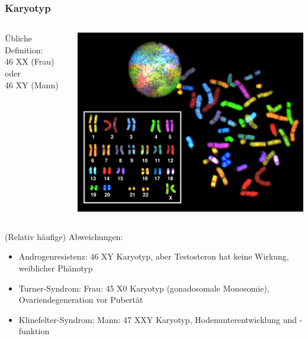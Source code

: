 \documentclass{beamer}
\begin{document}
\begin{frame}
\frametitle{Karyotyp}

\begin{columns}[c]

\begin{column}{5cm}



Übliche Definition:  \\46 XX (Frau) oder \\ 46 XY (Mann) \\[0.2 cm]


\end{column}


\begin{column}{5cm}
\begin{center}
  \includegraphics[width=\textwidth]{karyogram.png}
\end{center}

\end{column}



\end{columns}

\pause

(Relativ häufige) Abweichungen:
\begin{itemize}
\item
Androgenresistenz: 46 XY Karyotyp, aber Testosteron hat keine Wirkung, weiblicher Phänotyp
\item
Turner-Syndrom:	Frau: 45 X0 Karyotyp (gonadosomale Monosomie), Ovariendegeneration vor Pubertät
\item
 Klinefelter-Syndrom: Mann: 47 XXY Karyotyp, Hodenunterentwicklung und -funktion
\end{itemize}



\end{frame}
\end{document}
